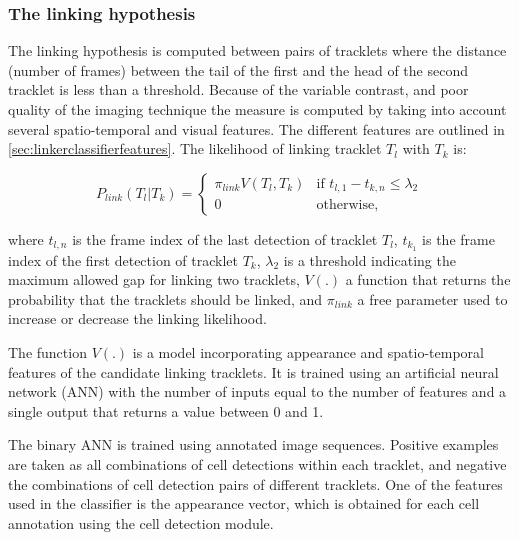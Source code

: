      	\subsubsection{The linking hypothesis \statusfirstdraft}
     	   	
     	   	The linking hypothesis is computed between pairs of tracklets where the distance (number of frames) between the tail of the first and the head of the second tracklet is less than a threshold. Because of the variable contrast, and poor quality of the imaging technique the measure is computed by taking into account several spatio-temporal and visual features. The different features are outlined in \cref{sec:linkerclassifierfeatures}. The likelihood of linking tracklet $T_l$ with $T_k$ is:
     	   	
     	   	\[
     	   		P_{link}(T_l|T_k) = \begin{cases}
     	   			\pi_{link} V(T_l, T_k)  & \text{if } t_{l,1} - t_{k,n} \leq \lambda_2 \\
     	   			0 & \text{otherwise,}
     	   		\end{cases}
     	   	\]
     	   	
     	   	\noindent where $t_{l,n}$ is the frame index of the last detection of tracklet $T_l$, $t_{k_1}$ is the frame index of the first detection of tracklet $T_k$, $\lambda_2$ is a threshold indicating the maximum allowed gap for linking two tracklets, $V(.)$ a function that returns the probability that the tracklets should be linked, and $\pi_{link}$ a free parameter used to increase or decrease the linking likelihood.

     	   	The function $V(.)$ is a model incorporating appearance and spatio-temporal features of the candidate linking tracklets. It is trained using an artificial neural network (ANN) with the number of inputs equal to the number of features and a single output that returns a value between 0 and 1. 
     	   	
     	   	The binary ANN is trained using annotated image sequences. Positive examples are taken as all combinations of cell detections within each tracklet, and negative the combinations of cell detection pairs of different tracklets. One of the features used in the classifier is the appearance vector, which is obtained for each cell annotation using the cell detection module.
     	   	
